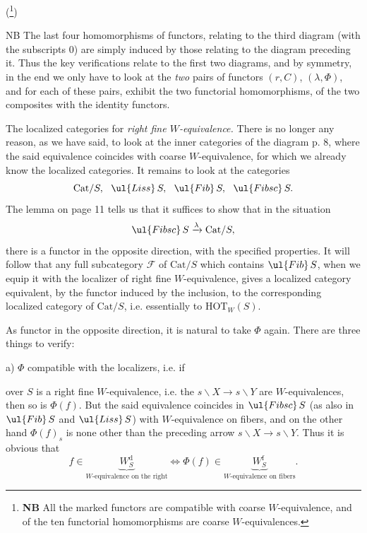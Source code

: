(\footnote[40]{\textbf{NB} All the marked functors are compatible with coarse $W$-equivalence, and of the ten functorial homomorphisms are coarse $W$-equivalences.})

NB The last four homomorphisms of functors, relating to the third diagram (with the subscripts 0) are simply induced by those relating to the diagram preceding it. Thus the key verifications relate to the first two diagrams, and by symmetry, in the end we only have to look at the \textit{two} pairs of functors $(r,C)$, $(\lambda,\Phi)$, and for each of these pairs, exhibit the two functorial homomorphisms, of the two composites with the identity functors.



 The localized categories for \textit{right fine $W$-equivalence.} There is no longer any reason, as we have said, to look at the inner categories of the diagram p. 8, where the said equivalence coincides with coarse $W$-equivalence, for which we already know the localized categories. It remains to look at the categories
\[\mathrm{Cat}/S,\ \ \ul{Liss}\,S,\ \ \ul{Fib}\,S,\ \ \ul{Fibsc}\,S.\]
The lemma on page 11 tells us that it suffices to show that in the situation
\[\ul{Fibsc}\,S \xrightarrow{\lambda} \mathrm{Cat}/S,\]
there is a functor in the opposite direction, with the specified properties. It will follow that any full subcategory $\mathcal{F}$ of $\mathrm{Cat}/S$ which contains $\ul{Fib}\,S$, when we equip it with the localizer of right fine $W$-equivalence, gives a localized category equivalent, by the functor induced by the inclusion, to the corresponding localized category of $\mathrm{Cat}/S$, i.e. essentially to $\mathrm{HOT}_W(S)$. %

As functor in the opposite direction, it is natural to take $\Phi$ again. There are three things to verify:

a) $\Phi$ compatible with the localizers, i.e. if
over $S$ is a right fine $W$-equivalence, i.e. the $s\backslash X \longrightarrow s\backslash Y$ are $W$-equivalences, then so is $\Phi(f)$. But the said equivalence coincides
in $\ul{Fibsc}\,S$ (as also in $\ul{Fib}\,S$ and $\ul{Liss}\,S$) with $W$-equivalence on fibers, and on the other hand $\Phi(f)_s$ is none other than the preceding arrow $s\backslash X \longrightarrow s\backslash Y$. Thus it is obvious that
\[f \in \underbrace{W_S^{\mathrm{d}}}_{W\text{-equivalence on the right}} \iff \Phi(f) \in \underbrace{W_S^{\mathrm{f}}}_{W\text{-equivalence on fibers}} .\]

